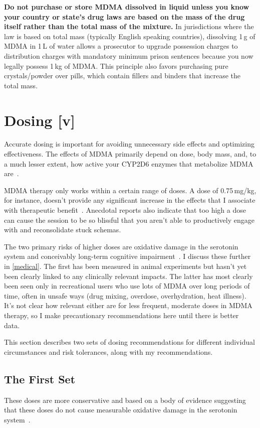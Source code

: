 \documentclass[11pt,oneside]{book}
\let\cite\parencite
\begin{document}
\textbf{Do not purchase or store MDMA dissolved in liquid unless you know your country or state's drug laws are based on the mass of the drug itself rather than the total mass of the mixture.} In jurisdictions where the law is based on total mass (typically English speaking countries), dissolving 1\,g of MDMA in 1\,L of water allows a prosecutor to upgrade possession charges to distribution charges with mandatory minimum prison sentences because you now legally possess 1\,kg of MDMA. This principle also favors purchasing pure crystals/powder over pills, which contain fillers and binders that increase the total mass.

\section{Dosing [v]}
\label{sec:dosing}
Accurate dosing is important for avoiding unnecessary side effects and optimizing effectiveness. The effects of MDMA primarily depend on dose, body mass, and, to a much lesser extent, how active your CYP2D6 enzymes that metabolize MDMA are~\cite{studerusResponse}.

MDMA therapy only works within a certain range of doses. A dose of 0.75\,mg/kg, for instance, doesn't provide any significant increase in the effects that I associate with therapeutic benefit~\cite{bediMDMALowDose}. Anecdotal reports also indicate that too high a dose can cause the session to be so blissful that you aren't able to productively engage with and reconsolidate stuck schemas.

The two primary risks of higher doses are oxidative damage in the serotonin system and conceivably long-term cognitive impairment~\cite{baggottDamage}. I discuss these further in \cref{medical}. The first has been measured in animal experiments but hasn't yet been clearly linked to any clinically relevant impacts. The latter has most clearly been seen only in recreational users who use lots of MDMA over long periods of time, often in unsafe ways (drug mixing, overdose, overhydration, heat illness). It's not clear how relevant either are for less frequent, moderate doses in MDMA therapy, so I make precautionary recommendations here until there is better data.

This section describes two sets of dosing recommendations for different individual circumstances and risk tolerances, along with my recommendations.

\subsection*{The First Set}
These doses are more conservative and based on a body of evidence suggesting that these doses do not cause measurable oxidative damage in the serotonin system~\cite{baggottSupplements}.
\end{document}
